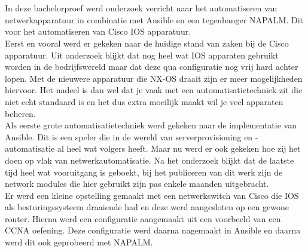 


\chapter*{}

In deze bachelorproef werd onderzoek verricht naar het automatiseren van netwerkapparatuur in combinatie met Ansible en een tegenhanger NAPALM. Dit voor het automatiseren van Cisco IOS apparatuur. 
\\

Eerst en vooral werd er gekeken naar de huidige stand van zaken bij de Cisco apparatuur. Uit onderzoek blijkt dat nog heel wat IOS apparaten gebruikt worden in de bedrijfswereld maar dat deze qua configuratie nog vrij hard achter lopen. Met de nieuwere apparatuur die NX-OS draait zijn er meer mogelijkheden hiervoor. Het nadeel is dan wel dat je vaak met een automatisatietechniek zit die niet echt standaard is en het dus extra moeilijk maakt wil je veel apparaten beheren.
\\

Als eerste grote automatisatietechniek werd gekeken naar de implementatie van Ansible. Dit is een speler die in de wereld van serverprovisioning en -automatisatie al heel wat volgers heeft. Maar nu werd er ook gekeken hoe zij het doen op vlak van netwerkautomatisatie. Na het onderzoek blijkt dat de laatste tijd heel wat vooruitgang is geboekt, bij het publiceren van dit werk zijn de network modules die hier gebruikt zijn pas enkele maanden uitgebracht. 
\\
Er werd een kleine opstelling gemaakt met een netwerkswitch van Cisco die IOS als besturingssysteem draaiende had en deze werd aangesloten op een gewone router. Hierna werd een configuratie aangemaakt uit een voorbeeld van een CCNA oefening. Deze configuratie werd daarna nagemaakt in Ansible en daarna werd dit ook geprobeerd met NAPALM.
\\

